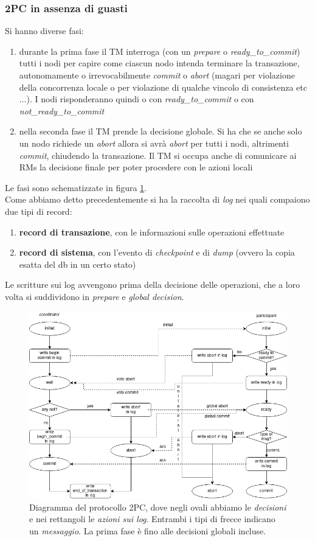 \documentclass[a4paper,12pt, oneside]{book}
\begin{document}
\subsubsection{2PC in assenza di guasti}
Si hanno diverse fasi:
\begin{enumerate}
  \item durante la prima fase il TM interroga (con un \textit{prepare} o
  \textit{ready\_to\_commit}) tutti i nodi per capire come 
  ciascun nodo intenda terminare la transazione, autonomamente o
  irrevocabilmente \textit{commit} o \textit{abort} (magari per violazione della
  concorrenza locale o per violazione di qualche vincolo di consistenza
  etc$\ldots$). I nodi risponderanno quindi o con \textit{ready\_to\_commit} o
  con \\
  \textit{not\_ready\_to\_commit}
  \item nella seconda fase il TM prende la decisione globale. Si ha che se anche
  solo un nodo richiede un \textit{abort} allora si avrà \textit{abort} per
  tutti i nodi, altrimenti \textit{commit}, chiudendo la transazione. Il TM si
  occupa anche di comunicare ai RMs la decisione finale per poter procedere con
  le azioni locali 
\end{enumerate}
Le fasi sono schematizzate in figura \ref{fig:2pc}.\\
Come abbiamo detto precedentemente si ha la raccolta di \textit{log} nei quali
compaiono due tipi di record:
\begin{enumerate}
  \item \textbf{record di transazione}, con le informazioni sulle operazioni
  effettuate
  \item \textbf{record di sistema}, con l'evento di \textit{checkpoint} e di
  \textit{dump} (ovvero la copia esatta del db in un certo stato)
\end{enumerate}
Le scritture sui log avvengono prima della decisione delle operazioni, che a
loro volta si suddividono in \textit{prepare} e \textit{global decision}.
\begin{figure}[h]
  \centering
  \includegraphics[scale = 0.5]{img/2pc.png}
  \caption{Diagramma del protocollo 2PC, dove negli ovali abbiamo le\emph{
      decisioni} e nei rettangoli le \emph{azioni sui log}. Entrambi i tipi di
    frecce indicano un \emph{messaggio}. La prima fase è fino alle decisioni
    globali incluse.}
  \label{fig:2pc}
\end{figure}
\end{document}
